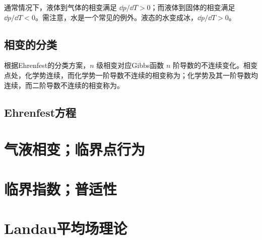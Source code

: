 		通常情况下，液体到气体的相变满足 $\dd p / \dd T > 0$；而液体到固体的相变满足 $\dd p / \dd T < 0$。需注意，水是一个常见的例外。液态的水变成冰，$\dd p / \dd T > 0$。
		
	\subsection{相变的分类}
		根据Ehrenfest的分类方案，$n$ 级相变对应Gibbs函数 $n$ 阶导数的不连续变化。相变点处，化学势连续，而化学势一阶导数不连续的相变称为；化学势及其一阶导数均连续，而二阶导数不连续的相变称为。
	\subsection{Ehrenfest方程}
\section{气液相变；临界点行为}
\section{临界指数；普适性}
\section{Landau平均场理论}
	
\raggedbottom%
\pagebreak